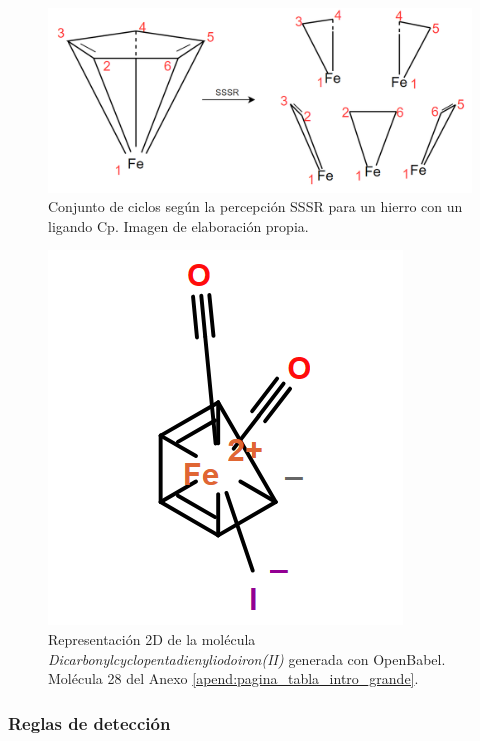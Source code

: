 \begin{figure}[h!]
    \centering
    \includegraphics[scale=0.35]{imagenes/diseno/dibujo/sssr_iron.png}
    \caption{Conjunto de ciclos según la percepción SSSR para un hierro con un ligando Cp. Imagen de elaboración propia.}
    \label{fig:sssr_iron(II)}
\end{figure}


\begin{figure}[h!]
    \centering
    \includegraphics[scale=0.5]{imagenes/diseno/dibujo/iron(II)_Original.png}
    \caption{Representación 2D de la molécula \textit{Dicarbonylcyclopentadienyliodoiron(II)} generada con OpenBabel. Molécula 28 del Anexo \ref{apend:pagina_tabla_intro_grande}.}
    \label{fig:iron(II)Original}
\end{figure}

\subsubsection{Reglas de detección} \label{reglas_deteccion_cp}

